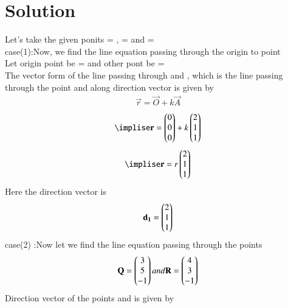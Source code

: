 \documentclass[journal,12pt,twocolumn]{IEEEtran}
\begin{document}
\section{Solution}
Let's take the given ponits = , = and =
\\
case(1):Now, we find the line equation passing through the origin to point 
\\
Let origin point be = and other pont be =
\\ 
The vector form of the line passing through  and , which is the line passing through the point  and along direction vector  is given by 
\begin{align}
\vec{r}=\vec{O}+k\vec{A}
\end{align}
\begin{align}
\implise \vec{r}=\myvec{0\\0\\0}+k\myvec{2\\1\\1}
\end{align}
\begin{align}
\implise \vec{r}=r\myvec{2\\1\\1}
\end{align}
Here the direction vector is 
\begin{align}
\mathbf{d_1}=\begin{pmatrix}2\\1\\1\end{pmatrix}
\end{align}
case(2) :Now let we find the line equation passing through the points
\begin{align}
\mathbf{Q}=\begin{pmatrix}3\\5\\-1\end{pmatrix} and \mathbf{R}=\begin{pmatrix}4\\3\\-1\end{pmatrix}
\end{align}
Direction vector  of the points  and  is given by 
\end{document}
